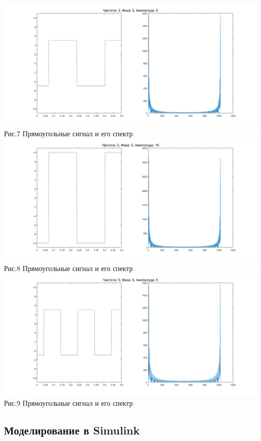 \documentclass[a4paper]{article}
\begin{document}
\begin{center}
	\includegraphics[scale = 0.5]{pictures/3_5_5.png}
	\\ Рис.7 Прямоугольные сигнал и его спектр
	\includegraphics[scale = 0.5]{pictures/3_5_10.png}
	\\ Рис.8 Прямоугольные сигнал и его спектр
	\includegraphics[scale = 0.5]{pictures/5_5_5.png}  
	\\ Рис.9 Прямоугольные сигнал и его спектр
\end{center}

\subsection{Моделирование в Simulink}
\end{document}
